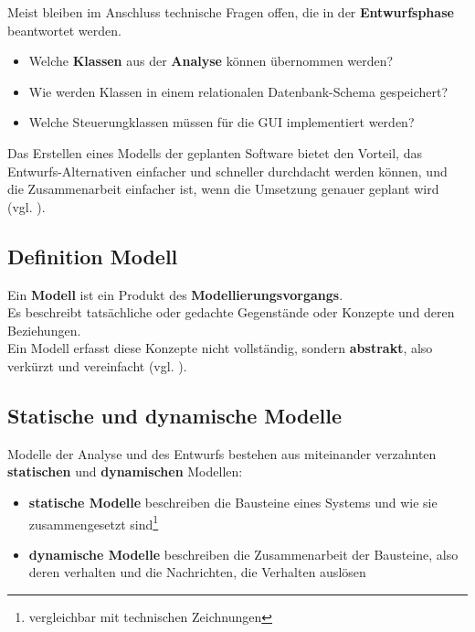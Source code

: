 \noindent
Meist bleiben im Anschluss technische Fragen offen, die in der \textbf{Entwurfsphase} beantwortet werden.

\begin{itemize}
    \item Welche \textbf{Klassen} aus der \textbf{Analyse} können übernommen werden?
    \item Wie werden Klassen in einem relationalen Datenbank-Schema gespeichert?
    \item Welche Steuerungklassen müssen für die GUI implementiert werden?
\end{itemize}

\noindent
Das Erstellen eines Modells der geplanten Software bietet den Vorteil, das Entwurfs-Alternativen einfacher und schneller durchdacht werden können, und die Zusammenarbeit einfacher ist, wenn die Umsetzung genauer geplant wird (vgl. \cite[2]{Wed09b}).


\subsection*{Definition Modell}


\vspace{2mm}
\begin{tcolorbox}[title=Arbeitsdefinition ``Modell``]
    Ein \textbf{Modell} ist ein Produkt des \textbf{Modellierungsvorgangs}.\\

    \noindent
    Es beschreibt tatsächliche oder gedachte Gegenstände oder Konzepte und deren Beziehungen.\\

    \noindent
    Ein Modell erfasst diese Konzepte nicht vollständig, sondern \textbf{abstrakt}, also verkürzt und vereinfacht (vgl. \cite[2]{Wed09b}).
\end{tcolorbox}
\vspace{2mm}

\subsection*{Statische und dynamische Modelle}

\noindent
Modelle der Analyse und des Entwurfs bestehen aus miteinander verzahnten \textbf{statischen} und \textbf{dynamischen} Modellen:

\begin{itemize}
    \item \textbf{statische Modelle} beschreiben die Bausteine eines Systems und wie sie zusammengesetzt sind\footnote{vergleichbar mit technischen Zeichnungen}
    \item \textbf{dynamische Modelle} beschreiben die Zusammenarbeit der Bausteine, also deren verhalten und die Nachrichten, die Verhalten auslösen
\end{itemize}


